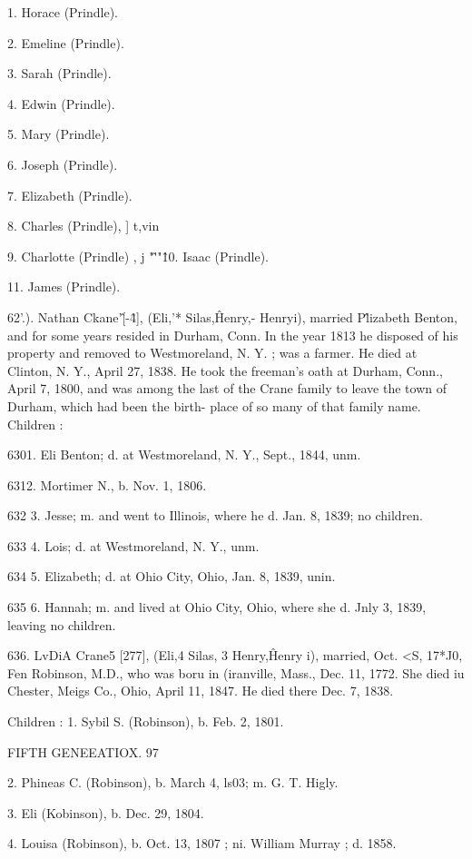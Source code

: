 1. Horace (Prindle). 

2. Emeline (Prindle). 

3. Sarah (Prindle). 

4. Edwin (Prindle). 

5. Mary (Prindle). 

6. Joseph (Prindle). 

7. Elizabeth (Prindle). 

8. Charles (Prindle), ] t,vin 

9. Charlotte (Prindle) , j "\^ '"\^ 

10. Isaac (Prindle). 

11. James (Prindle). 

62'.). Nathan Ckane'\^ [-\^4], (Eli,'* Silas,\^ Henry,- Henryi), 
married P\^lizabeth Benton, and for some years resided in Durham, 
Conn. In the year 1813 he disposed of his property and removed 
to Westmoreland, N. Y. ; was a farmer. He died at Clinton, 
N. Y., April 27, 1838. He took the freeman's oath at Durham, 
Conn., April 7, 1800, and was among the last of the Crane 
family to leave the town of Durham, which had been the birth- 
place of so many of that family name. Children : 

6301. Eli Benton; d. at Westmoreland, N. Y., Sept., 1844, unm. 

6312. Mortimer N., b. Nov. 1, 1806. 

632  3. Jesse; m. and went to Illinois, where he d. Jan. 8, 1839; no 
children. 

633  4. Lois; d. at Westmoreland, N. Y., unm. 

634  5. Elizabeth; d. at Ohio City, Ohio, Jan. 8, 1839, unin. 

635  6. Hannah; m. and lived at Ohio City, Ohio, where she d. Jnly 
3, 1839, leaving no children. 

636. LvDiA Crane5 [277], (Eli,4 Silas, 3 Henry,\^ Henry i), 
married, Oct. <S, 17*J0, Fen Robinson, M.D., who was boru in 
(iranville, Mass., Dec. 11, 1772. She died iu Chester, Meigs 
Co., Ohio, April 11, 1847. He died there Dec. 7, 1838. 

Children : 
1. Sybil S. (Robinson), b. Feb. 2, 1801. 



FIFTH GENEEATIOX. 97 

2. Phineas C. (Robinson), b. March 4, ls03; m. G. T. Higly. 

3. Eli (Kobinson), b. Dec. 29, 1804. 

4. Louisa (Robinson), b. Oct. 13, 1807 ; ni. William Murray ; d. 1858. 

